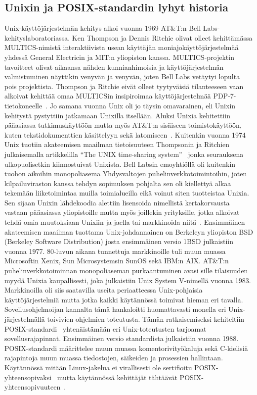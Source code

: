\subsection{Unixin ja POSIX-standardin lyhyt historia}

Unix-käyttöjärjestelmän kehitys alkoi vuonna 1969 AT\&T:n Bell Labs-kehityslaboratoriassa.
Ken Thompson ja Dennis Ritchie olivat olleet kehittämässa MULTICS-nimistä interaktiivista usean käyttäjän moniajokäyttöjärjestelmää yhdessä General Electricin ja MIT:n yliopiston kanssa.
MULTICS-projektin tavoitteet olivat aikaansa nähden kunnianhimoisia ja käyttöjärjestelmän valmistuminen näyttikin venyvän ja venyvän, joten Bell Labs vetäytyi lopulta pois projektista.
Thompson ja Ritchie eivät olleet tyytyväisiä tilanteeseen vaan alkoivat kehittää omaa MULTICSin insipiroimaa käyttöjärjestelmää PDP-7-tietokoneelle~\cite{UnixHistoryBook}.
Jo samana vuonna Unix oli jo täysin omavarainen, eli Unixin kehitystä pystyttiin jatkamaan Unixilla itsellään.
Aluksi Unixia kehitettiin pääasiassa tutkimuskäyttöön mutta myös AT\&T:n sisäiseen toimistokäyttöön,
kuten tekstidokumenttien käsittelyyn sekä latomiseen~\cite{UnixFsBook}.
Kuitenkin vuonna 1974 Unix tuotiin akateemisen maailman tietoisuuteen Thompsonin ja Ritchien julkaisemalla artikkelilla ``The UNIX time-sharing system''~\cite{UnixPaper} jonka seurauksena ulkopuolisetkin kiinnostuivat Unixista.
Bell Labsin emoyhtiöllä oli kuitenkin tuohon aikoihin monopoliasema Yhdysvaltojen puhelinverkkotoimintoihin,
joten kilpailuviraston kanssa tehdyn sopimuksen pohjalta sen oli kiellettyä alkaa tekemään liiketoimintaa muilla toimialueilla eikä voinut siten tuotteistaa Unixia.
Sen sijaan Unixin lähdekoodia alettiin lisensoida nimellistä kertakorvausta vastaan pääasiassa yliopistoille mutta myös joillekin yrityksille,
jotka alkoivat tehdä omia muutoksiaan Unixiin ja jaella tai markkinoida niitä~\cite{UnixFsBook}.
Ensimmäinen akateemisen maailman tuottama Unix-johdannainen on Berkeleyn yliopiston BSD (Berkeley Software Distribution) josta ensimmäinen versio 1BSD julkaistiin vuonna 1977.
80-luvun aikana tunnettuja markkinoille tuli muun muassa Microsoftin Xenix, Sun Microsystemsin SunOS sekä IBM:n AIX.
AT\&T:n puhelinverkkotoiminnan monopoliaseman purkaantuminen avasi sille tilaisuuden myydä Unixia kaupallisesti,
joka julkaistiin Unix System V-nimellä vuonna 1983.
Markkinoilla oli siis saatavilla useita periaatteessa Unix-pohjaisia käyttöjärjestelmiä mutta jotka kaikki käytännössä toimivat hieman eri tavalla.
Sovellusohjelmoijan kannalta tämä hankaloitti huomattavasti monella eri Unix-järjestelmällä toivivien ohjelmien toteutusta.
Tämän ratkaisemiseksi kehiteltiin POSIX-standardi~\cite{PosixSpec} yhtenäistämään eri Unix-toteutusten tarjoamat sovellusrajapinnat.
Ensimmäinen versio standardista julkaistiin vuonna 1988.
POSIX-standardi määrittelee muun muassa komentorivityökaluja sekä C-kielisiä rajapintoja muun muassa tiedostojen, säikeiden ja prosessien hallintaan.
Käytännössä mitään Linux-jakelua ei virallisesti ole sertifioitu POSIX-yhteensopivaksi~\cite{PosixLinuxCompat}
mutta käytännössä kehittäjät tähtäävät POSIX-yhteensopivuuteen~\cite{LinuxKernelBook}.

